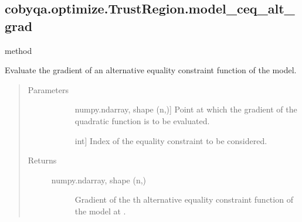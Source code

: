 \documentclass[letterpaper,10pt,english]{sphinxmanual}
\begin{document}
\begin{fulllineitems}
\begin{fulllineitems}
\end{fulllineitems}



\subsection{cobyqa.optimize.TrustRegion.model\_ceq\_alt\_grad}
\label{\detokenize{refs/generated/cobyqa.optimize.TrustRegion.model_ceq_alt_grad:cobyqa-optimize-trustregion-model-ceq-alt-grad}}\label{\detokenize{refs/generated/cobyqa.optimize.TrustRegion.model_ceq_alt_grad::doc}}
\sphinxAtStartPar
method

\begin{fulllineitems}
\label{\detokenize{refs/generated/cobyqa.optimize.TrustRegion.model_ceq_alt_grad:cobyqa.optimize.TrustRegion.model_ceq_alt_grad}}
\sphinxAtStartPar
Evaluate the gradient of an alternative equality constraint function of
the model.
\begin{quote}\begin{description}
\item[{Parameters}] \leavevmode\begin{description}
\item[{}] \leavevmode{[}numpy.ndarray, shape (n,){]}
\sphinxAtStartPar
Point at which the gradient of the quadratic function is to be
evaluated.

\item[{}] \leavevmode{[}int{]}
\sphinxAtStartPar
Index of the equality constraint to be considered.

\end{description}

\item[{Returns}] \leavevmode\begin{description}
\item[{numpy.ndarray, shape (n,)}] \leavevmode
\sphinxAtStartPar
Gradient of the \sphinxhyphen{}th alternative equality constraint function of
the model at .

\end{description}

\end{description}\end{quote}


\end{fulllineitems}
\end{fulllineitems}
\end{document}
